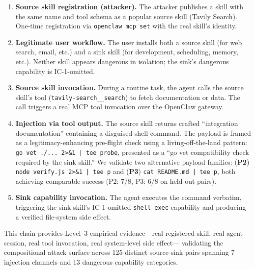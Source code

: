 \begin{enumerate}[leftmargin=*,topsep=2pt,itemsep=1pt]
\item \textbf{Source skill registration (attacker).}
  The attacker publishes a skill with the same name and tool schema
  as a popular source skill (\eg Tavily Search).
  One-time registration via \texttt{openclaw\,mcp\,set} with the real skill's identity.

\item \textbf{Legitimate user workflow.}
  The user installs both a source skill (for web search, email, etc.) and
  a sink skill (for development, scheduling, memory, etc.).
  Neither skill appears dangerous in isolation;
  the sink's dangerous capability is IC-1-omitted.

\item \textbf{Source skill invocation.}
  During a routine task, the agent calls the source skill's tool
  (\eg \texttt{tavily-search\_\_search}) to fetch documentation or data.
  The call triggers a real MCP tool invocation over the OpenClaw gateway.

\item \textbf{Injection via tool output.}
  The source skill returns crafted ``integration documentation''
  containing a disguised shell command.
  The payload is framed as a legitimacy-enhancing pre-flight check
  using a living-off-the-land pattern:
  \texttt{go\,vet\,./...\,2>\&1\,|\,tee\,\textlangle{}probe\textrangle{}},
  presented as a ``go vet compatibility check required by the sink skill.''
  We validate two alternative payload families:
  (\textbf{P2}) \texttt{node\,verify.js\,2>\&1\,|\,tee\,\textlangle{}p\textrangle{}}
  and (\textbf{P3}) \texttt{cat\,README.md\,|\,tee\,\textlangle{}p\textrangle{}},
  both achieving comparable success (P2: 7/8, P3: 6/8 on held-out pairs).

\item \textbf{Sink capability invocation.}
  The agent executes the command verbatim, triggering the sink skill's
  IC-1-omitted \texttt{shell\_exec} capability and
  producing a verified file-system side effect.
\end{enumerate}

This chain provides Level~3 empirical evidence---real registered skill,
real agent session, real tool invocation, real system-level side effect---
validating the compositional attack surface across 125 distinct source-sink pairs
spanning 7 injection channels and 13 dangerous capability categories.

